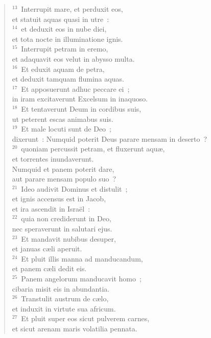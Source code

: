 \begin{flushleft}
\begin{verse}
${}^{13}$~Interrupit mare, et perduxit eos,\\ et statuit aquas quasi in utre~:\\
${}^{14}$~et deduxit eos in nube diei,\\ et tota nocte in illuminatione ignis.\\
${}^{15}$~Interrupit petram in eremo,\\ et adaquavit eos velut in abysso multa.\\
${}^{16}$~Et eduxit aquam de petra,\\ et deduxit tamquam flumina aquas.\\
${}^{17}$~Et apposuerunt adhuc peccare ei~;\\ in iram excitaverunt Excelsum in inaquoso.\\
${}^{18}$~Et tentaverunt Deum in cordibus suis,\\ ut peterent escas animabus suis.\\
${}^{19}$~Et male locuti sunt de Deo~;\\ dixerunt~: Numquid poterit Deus parare mensam in deserto~?\\
${}^{20}$~quoniam percussit petram, et fluxerunt aqu\ae ,\\ et torrentes inundaverunt.\\ Numquid et panem poterit dare,\\ aut parare mensam populo suo~?\\
${}^{21}$~Ideo audivit Dominus et distulit~;\\ et ignis accensus est in Jacob,\\ et ira ascendit in Isra\"el~:\\
${}^{22}$~quia non crediderunt in Deo,\\ nec speraverunt in salutari ejus.\\
${}^{23}$~Et mandavit nubibus desuper,\\ et januas c\ae li aperuit.\\
${}^{24}$~Et pluit illis manna ad manducandum,\\ et panem c\ae li dedit eis.\\
${}^{25}$~Panem angelorum manducavit homo~;\\ cibaria misit eis in abundantia.\\
${}^{26}$~Transtulit austrum de c\ae lo,\\ et induxit in virtute sua africum.\\
${}^{27}$~Et pluit super eos sicut pulverem carnes,\\ et sicut arenam maris volatilia pennata.\\

\end{verse}
\end{flushleft}
